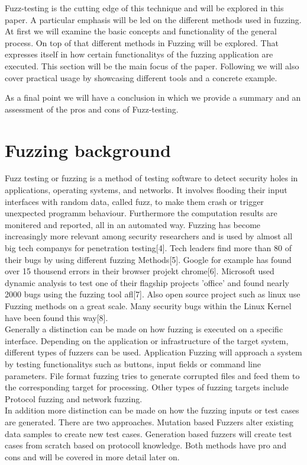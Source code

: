 \documentclass[journal=tosc,final]{iacrtrans}
\begin{document}
Fuzz-testing is the cutting edge of this technique and will be explored in this paper. A particular emphasis will be led on the different methods used in fuzzing. 
At first we will examine the basic concepts and functionality of the general process. On top of that different methods in Fuzzing will be explored. That expresses itself in how certain functionalitys of the fuzzing application are executed. This section will be the main focus of the paper. Following we will also cover practical usage by showcasing different tools and a concrete example. 

As a final point we will have a conclusion in which we provide a summary and an assessment of the pros and cons of Fuzz-testing. 
\newpage
\section{Fuzzing background}
Fuzz testing or fuzzing is a method of testing software to detect security holes in applications, operating systems, and networks. It involves flooding their input interfaces with random data, called fuzz, to make them crash or trigger unexpected programm behaviour. Furthermore the computation results are monitered and reported, all in an automated way. Fuzzing has become increasingly more relevant among security researchers and is used by almost all big tech companys for penetration testing[4]. Tech leaders find more than 80 of their bugs by using different fuzzing Methods[5]. Google for example  has found over 15 thousend errors in their browser projekt chrome[6]. Microsoft used dynamic analysis to test one of their flagship projects 'office' and found nearly 2000 bugs using the fuzzing tool afl[7]. Also open source project such as linux use Fuzzing methods on a great scale. Many security bugs within the Linux Kernel have been found this way[8].\\
Generally a distinction can be made on how fuzzing is executed on a specific interface. Depending on the application or infrastructure of the target system, different types of fuzzers can be used. Application Fuzzing will approach a system by testing functionalitys such as buttons, input fields or command line parameters. File format fuzzing tries to generate corrupted files and feed them to the corresponding target for processing. Other types of fuzzing targets include Protocol fuzzing and network fuzzing.\\
In addition more distinction can be made on how the fuzzing inputs or test cases are generated. There are two approaches. Mutation based Fuzzers alter existing data samples to create new test cases.
Generation based fuzzers will create test cases from scratch based on protocoll knowledge. 
Both methods have pro and cons and will be covered in more detail later on.
\end{document}

